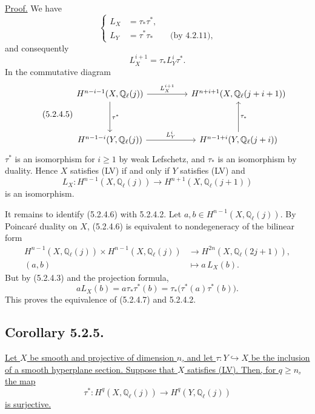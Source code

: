 \underline{Proof.}
We have
\begin{equation}\tag{5.2.4.3}
\left\{
\begin{aligned}
L_X&=\tau_*\tau^*,\\[1ex]
L_Y&=\tau^*\tau_* \qquad\text{(by 4.2.11),}
\end{aligned}
\right.
\end{equation}
and consequently
\begin{equation}\tag{5.2.4.4}
L_X^{i+1}=\tau_*L_Y^i\tau^*.
\end{equation}
In the commutative diagram
\begin{equation}\tag{5.2.4.5}
\begin{tikzcd}[column sep=huge,row sep=huge]
H^{n-i-1}(X,\mathbb Q_\ell(j))
  \arrow[r,"L_X^{i+1}"]\arrow[d,"\tau^*"]
  &H^{n+i+1}(X,\mathbb Q_\ell(j+i+1))\\
H^{n-1-i}(Y,\mathbb Q_\ell(j))
  \arrow[r,"L_Y^i"]
  &H^{n-1+i}(Y,\mathbb Q_\ell(j+i))\arrow[u,"\tau_*"']
\end{tikzcd}
\end{equation}
$\tau^*$ is an isomorphism for $i\geq1$ by weak Lefschetz, and $\tau_*$ is
an isomorphism by duality.  Hence $X$ satisfies (LV) if and only if $Y$
satisfies (LV) and
\begin{equation}\tag{5.2.4.6}
L_X:H^{n-1}(X,\mathbb Q_\ell(j))
\longrightarrow H^{n+1}(X,\mathbb Q_\ell(j+1))
\end{equation}
is an isomorphism.

It remains to identify (5.2.4.6) with 5.2.4.2.  Let
$a,b\in H^{n-1}(X,\mathbb Q_\ell(j))$.  By Poincaré duality on $X$,
(5.2.4.6) is equivalent to nondegeneracy of the bilinear form
\begin{equation}\tag{5.2.4.7}
\begin{aligned}
H^{n-1}(X,\mathbb Q_\ell(j))\times
H^{n-1}(X,\mathbb Q_\ell(j))
&\longrightarrow H^{2n}(X,\mathbb Q_\ell(2j+1)),\\
(a,b)&\longmapsto a\,L_X(b).
\end{aligned}
\end{equation}
But by (5.2.4.3) and the projection formula,
\[
aL_X(b)=a\tau_*\tau^*(b)
=\tau_*\bigl(\tau^*(a)\tau^*(b)\bigr).
\]
This proves the equivalence of (5.2.4.7) and 5.2.4.2.

\subsection*{Corollary 5.2.5.}
\underline{Let $X$ be smooth and projective of dimension $n$, and let
$\tau:Y\hookrightarrow X$ be the inclusion of a smooth hyperplane section.
Suppose that $X$ satisfies (LV).  Then, for $q\geq n$, the map}
\[
\tau^*:H^q(X,\mathbb Q_\ell(j))
\longrightarrow H^q(Y,\mathbb Q_\ell(j))
\]
\underline{is surjective.}

